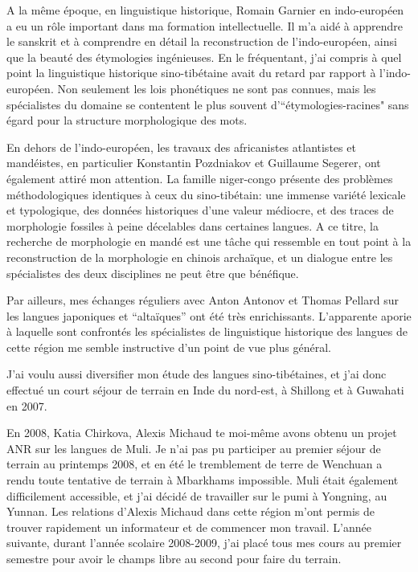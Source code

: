 \documentclass[oldfontcommands,oneside,a4paper,11pt]{memoir}
\begin{document}
A la même époque, en linguistique historique, Romain Garnier en indo-européen a eu un rôle important dans ma formation intellectuelle. Il m'a aidé à apprendre le sanskrit et à comprendre en détail la reconstruction de l'indo-européen, ainsi que la beauté des étymologies ingénieuses. En le fréquentant, j'ai compris à quel point la linguistique historique sino-tibétaine avait du retard par rapport à l'indo-européen. Non seulement les lois phonétiques ne sont pas connues, mais les spécialistes du domaine se contentent le plus souvent  d'``étymologies-racines" sans égard pour la structure morphologique des mots. 

En dehors de l'indo-européen, les travaux des africanistes atlantistes et mandéistes, en particulier Konstantin Pozdniakov et Guillaume Segerer, ont également attiré mon attention. La famille niger-congo présente des problèmes méthodologiques identiques à ceux du sino-tibétain: une immense variété lexicale et typologique, des données historiques d'une valeur médiocre, et des traces de morphologie fossiles à peine décelables dans certaines langues. A ce titre, la recherche de morphologie en mandé est une tâche qui ressemble en tout point à la reconstruction de la morphologie en chinois archaïque, et un dialogue entre les spécialistes des deux disciplines ne peut être que bénéfique.


Par ailleurs, mes échanges réguliers avec Anton Antonov et Thomas Pellard sur les langues japoniques et ``altaïques'' ont été très enrichissants. L'apparente aporie à laquelle sont confrontés les spécialistes de linguistique historique des langues de cette région me semble instructive d'un point de vue plus général. 



J'ai voulu aussi diversifier mon étude des langues sino-tibétaines, et j'ai donc effectué un court séjour de terrain en Inde du nord-est, à Shillong et à Guwahati en 2007.

En 2008,   Katia Chirkova, Alexis Michaud te moi-même avons   obtenu un projet ANR sur les langues de Muli. Je n'ai pas pu participer au premier séjour de terrain au printemps 2008, et en été le tremblement de terre de Wenchuan a rendu toute tentative de terrain à Mbarkhams impossible. Muli était également difficilement accessible, et j'ai décidé de travailler sur le pumi à Yongning, au Yunnan. Les relations d'Alexis Michaud dans cette région m'ont permis de trouver rapidement un informateur et de commencer mon travail. L'année suivante, durant l'année scolaire 2008-2009, j'ai      placé tous mes cours au premier semestre pour avoir le champs libre au second pour faire du terrain. 
\end{document}
